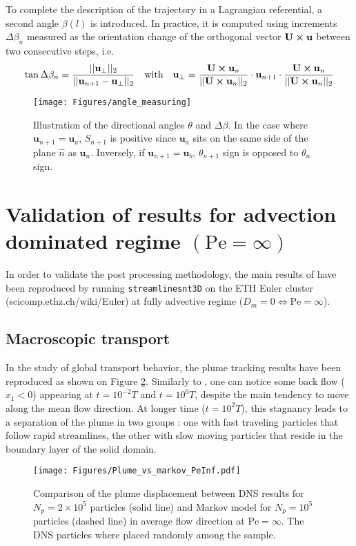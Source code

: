 To complete the description of the trajectory in a Lagrangian referential, a second angle $\beta(l)$ is introduced. In practice, it is computed using increments $\Delta \beta_n$ measured as the orientation change of the orthogonal vector $\textbf{U}\cross \textbf{u}$ between two consecutive steps, i.e.
\begin{equation}
\tan\Delta\beta_n = \frac{||\textbf{u}_\perp||_2}{||\textbf{u}_{n+1}-\textbf{u}_\perp||_2}
\quad\textrm{with}\quad
\textbf{u}_\perp =\frac{\textbf{U}\cross\textbf{u}_{n}}{||\textbf{U}\cross\textbf{u}_n||_2}\cdot \textbf{u}_{n+1}\cdot\frac{\textbf{U}\cross\textbf{u}_{n}}{||\textbf{U}\cross\textbf{u}_n||_2}
\end{equation}

\begin{figure}
	\centering
	\texttt{[image: Figures/angle\_measuring]}
	\caption{Illustration of the directional angles $\theta$ and $\Delta \beta$. In the case where $\textbf{u}_{n+1} = \textbf{u}_a$, $S_{n+1}$ is positive since $\textbf{u}_a$ sits on the same side of the plane $\hat{n}$ as $\textbf{u}_n$. Inversely, if $\textbf{u}_{n+1} = \textbf{u}_b$, $\theta_{n+1}$ sign is opposed to $\theta_n$ sign. }
	\label{fig:anglemeasuring}
\end{figure}

\section{Validation of \cite{Meyer2016} results for advection dominated regime $(\mathrm{Pe}=\infty)$}
In order to validate the post processing methodology, the main results of \cite{Meyer2016} have been reproduced by running \texttt{streamlinesnt3D} on the ETH Euler cluster (scicomp.ethz.ch/wiki/Euler) at fully advective regime ($D_m=0\Leftrightarrow\mathrm{Pe}=\infty$).
\subsection{Macroscopic transport}
In the study of global transport behavior, the plume tracking results have been reproduced as shown on Figure \ref{fig:plume_peinf}. 
Similarly to \cite{Meyer2016}, one can notice some back flow ($x_1<0$) appearing at $t=10^{-2}T$ and $t=10^0T$, despite the main tendency to move along the mean flow direction.  
At longer time ($t=10^2T$), this stagnancy leads to a separation of the plume in two groups : one with fast traveling particles that follow rapid streamlines, the other with slow moving particles that reside in the boundary layer of the solid domain.
\begin{figure}[h!]
	\centering
	\texttt{[image: Figures/Plume\_vs\_markov\_PeInf.pdf]}
	\caption{Comparison of the plume displacement between DNS results for $N_p=2\times 10^5$ particles (solid line) and Markov model for $N_p=10^5$ particles (dashed line) in average flow direction at $\mathrm{Pe}=\infty$. The DNS particles where placed randomly among the sample.}
	\label{fig:plume_peinf}
\end{figure}

